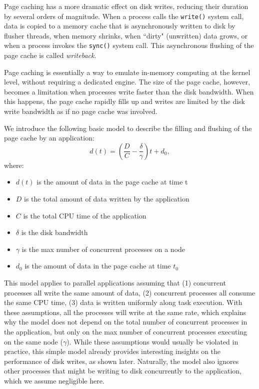 Page caching has a more dramatic effect on disk writes, reducing their duration
by several orders of magnitude. When a process calls the \texttt{write()} system
call, data is copied to a memory cache that is asynchronously written to disk by
flusher threads, when memory shrinks, when ``dirty" (unwritten) data grows, or
when a process invokes the \texttt{sync()} system call. This asynchronous
flushing of the page cache is called \emph{writeback}.

Page caching is essentially a way to emulate in-memory computing at the kernel
level, without requiring a dedicated engine. The size of the page cache,
however, becomes a limitation when processes write faster than the disk
bandwidth. When this happens, the page cache rapidly fills up and writes are
limited by the disk write bandwidth as if no page cache was involved.

We introduce the following basic model to describe the filling and flushing of
the page cache by an application:
$$
d(t) = \left( \frac{D}{C} - \frac{\delta}{\gamma} \right)t + d_0,
$$
where:
\begin{itemize}
\item $d(t)$ is the amount of data in the page cache at time t
\item $D$ is the total amount of data written by the application
\item $C$ is the total CPU time of the application
\item $\delta$ is the disk bandwidth
\item $\gamma$ is the max number of concurrent processes on a node
\item $d_0$ is the amount of data in the page cache at time $t_0$
\end{itemize}

This model applies to parallel applications assuming that (1) concurrent
processes all write the same amount of data, (2) concurrent processes all
consume the same CPU time, (3) data is written uniformly along task execution.
With these assumptions, all the processes will write at the same rate, which
explains why the model does not depend on the total number of concurrent
processes in the application, but only on the max number of concurrent processes
executing on the same node ($\gamma$). While these assumptions would usually be
violated in practice, this simple model already provides interesting insights on
the performance of disk writes, as shown later. Naturally, the model also
ignores other processes that might be writing to disk concurrently to the
application, which we assume negligible here. 

